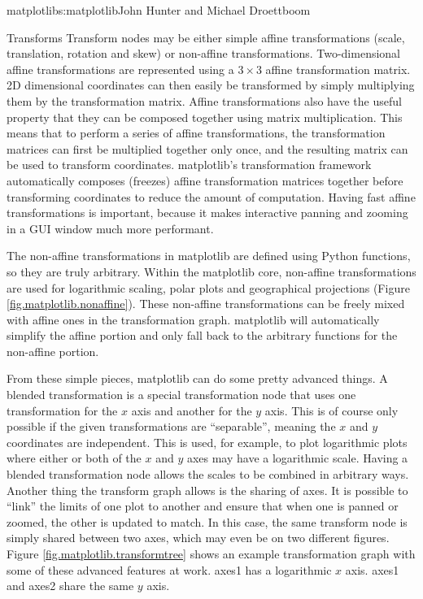 \begin{aosachapter}{matplotlib}{s:matplotlib}{John Hunter and Michael Droettboom}
\begin{aosasect1}{Transforms}
Transform nodes may be either simple affine transformations (scale,
translation, rotation and skew) or non-affine transformations.
Two-dimensional affine transformations are represented using a $3
\times 3$ affine transformation matrix.  2D dimensional coordinates
can then easily be transformed by simply multiplying them by the
transformation matrix.  Affine transformations also have the useful
property that they can be composed together using matrix
multiplication.  This means that to perform a series of affine
transformations, the transformation matrices can first be multiplied
together only once, and the resulting matrix can be used to transform
coordinates.  matplotlib's transformation framework automatically
composes (freezes) affine transformation matrices together before
transforming coordinates to reduce the amount of computation.  Having
fast affine transformations is important, because it makes interactive
panning and zooming in a GUI window much more performant.

The non-affine transformations in matplotlib are defined using Python
functions, so they are truly arbitrary.  Within the matplotlib core,
non-affine transformations are used for logarithmic scaling, polar
plots and geographical projections (Figure
\ref{fig.matplotlib.nonaffine}).  These non-affine transformations can
be freely mixed with affine ones in the transformation graph.
matplotlib will automatically simplify the affine portion and only
fall back to the arbitrary functions for the non-affine portion.


From these simple pieces, matplotlib can do some pretty advanced
things.  A blended transformation is a special transformation node
that uses one transformation for the $x$ axis and another for the $y$
axis.  This is of course only possible if the given transformations
are ``separable'', meaning the $x$ and $y$ coordinates are
independent.  This is used, for example, to plot logarithmic plots
where either or both of the $x$ and $y$ axes may have a logarithmic
scale.  Having a blended transformation node allows the scales to be
combined in arbitrary ways.  Another thing the transform graph allows
is the sharing of axes.  It is possible to ``link'' the limits of one
plot to another and ensure that when one is panned or zoomed, the
other is updated to match.  In this case, the same transform node is
simply shared between two axes, which may even be on two different
figures.  Figure \ref{fig.matplotlib.transformtree} shows an example
transformation graph with some of these advanced features at work.
axes1 has a logarithmic $x$ axis.  axes1 and axes2 share the same $y$
axis.


\end{aosasect1}
\end{aosachapter}
